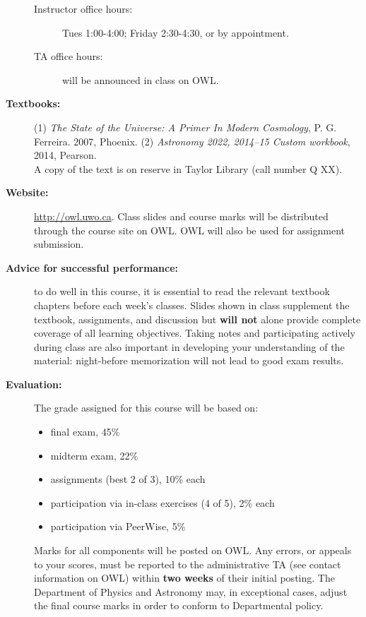 \documentclass[12pt]{article}
\begin{document}
\begin{description}
\begin{description}
   \item[Instructor office hours:]
   { Tues 1:00-4:00; Friday 2:30-4:30, or by appointment.} %

  \item[TA office hours:] will be announced in class on OWL.

   \end{description}

\item[\bf Textbooks:] (1) {\it The State of the Universe: A Primer In Modern Cosmology}, P. G. Ferreira. 2007, Phoenix.
(2) {\it Astronomy 2022, 2014--15 Custom workbook}, 2014, Pearson.\\
A copy of the text is on reserve in Taylor Library (call number Q XX). %

\item[\bf Website:] \url{http://owl.uwo.ca}. Class slides and course marks will be distributed through the course site
on OWL. OWL will also be used for assignment submission.

\item[\bf Advice for successful performance:] to do well in this course, it is essential to read the relevant textbook chapters before
each week's classes. Slides shown in class supplement the textbook, assignments, and discussion but {\bf will not} alone provide
complete coverage of all learning objectives. Taking notes and participating actively during class  are also important in developing
your understanding of the material: night-before memorization will not lead to good exam results.

\newpage


\item[\bf Evaluation:] The grade assigned for this course will be based on: 
\begin{itemize}
\item final exam, 45\%
\item midterm exam, 22\% 
\item assignments (best 2 of 3), 10\% each
\item participation via in-class exercises (4 of 5), 2\% each
\item participation via PeerWise, 5\%
\end{itemize}
Marks for all components will be posted on OWL. Any errors, or appeals to your scores, must be reported to 
the administrative TA (see contact information on OWL) within {\bf two weeks} of their initial posting.
The Department of Physics and Astronomy may, in exceptional cases, adjust the final course marks in order to conform to Departmental policy.


\end{description}
\end{document}
